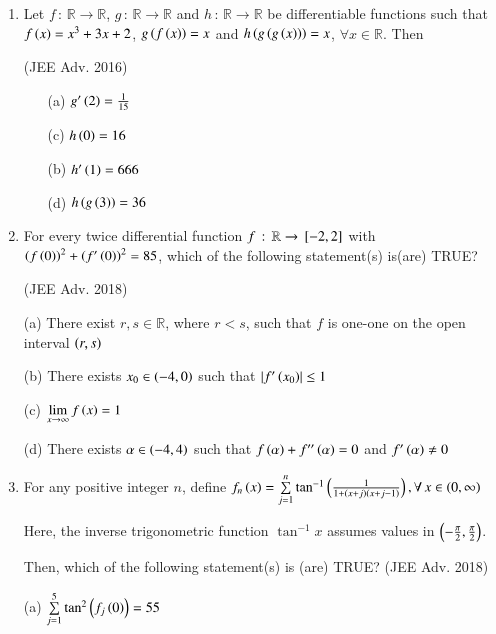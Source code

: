 \documentclass[journal,12pt,twocolumn]{IEEEtran}
\theoremstyle{remark}
\begin{document}
\begin{enumerate}

\item
Let $f\,:\,\mathbb{R}\to\mathbb{R}$, $g\,:\,\mathbb{R}\to\mathbb{R}$ and $h\,:\,\mathbb{R}\to\mathbb{R}$ be differentiable functions such that ${f\left(x\right)=x^{3}+3x+2}$, $g\left(f\left(x\right)\right)=x$ and $h\left(g\left(g\left(x\right)\right)\right)=x$, $\forall x\in\mathbb{R}$. Then 

\hfill{(JEE Adv. 2016)}

\begin{multicols}{2}
\begin{enumerate}

\item[(a)]$g^{\prime}\left(2\right)=\frac{1}{15}$
\item[(c)]$h\left(0\right)=16$
\item[(b)]$h^{\prime}\left(1\right)=666$
\item[(d)]$h\left(g\left(3\right)\right)=36$ 

\end{enumerate}
\end{multicols}

\item 
For every twice differential function ${f\,:\,\mathbb{R}\to{}\left[-2,2\right]}$ with $\left(f\left(0\right)\right)^{2}+\left(f^{\prime}\left(0\right)\right)^{2}=85$, which of the following statement(s) is(are) TRUE?

\hfill{(JEE Adv. 2018)}

(a) There exist $r,s\in\mathbb{R}$, where $r<s$, such that $f$ is one-one on the open interval $\left(r,s\right)$

(b) There  exists $x_{0}\in\left(-4,0\right)$ such that $\left\vert f^{\prime}\left(x_{0}\right)\right\vert\leq1$

(c) $\lim \limits_{x\to\infty}f\left(x\right)=1$

(d) There exists $\alpha\in\left(-4,4\right)$ such that ${f\left(\alpha\right)+f^{\prime\prime}\left(\alpha\right)=0}$ and ${f^{\prime}\left(\alpha\right)\not=0}$

\item 
For any positive integer $n$, define ${f_{n}\left(x\right)=\sum\limits_{j=1}^{n}\tan^{-1}\left(\frac{1}{1+\left(x+j\right)\left(x+j-1\right)}\right),\forall\,x\in\left(0,\infty\right)}$

Here, the inverse trigonometric function $\tan^{-1}x$ assumes values in $\left(-\frac{\pi}{2},\frac{\pi}{2}\right)$.

Then, which of the following statement(s) is (are) TRUE? \hfill{(JEE Adv. 2018)}

(a) $\sum\limits_{j=1}^{5}\tan^{2}\left(f_{j}\left(0\right)\right)=55$


\end{enumerate}
\end{document}
